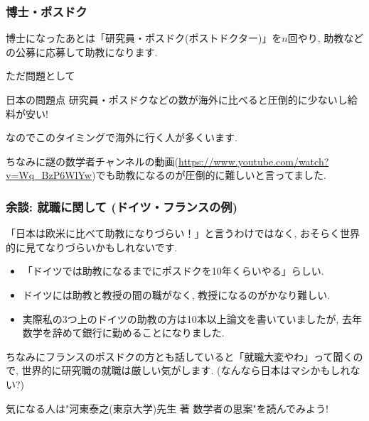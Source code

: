 \documentclass[11pt,dvipdfmx]{beamer}
\theoremstyle{definition}
\theoremstyle{remark}
\begin{document}
 
 \begin{frame} 
 \frametitle{博士・ポスドク}

博士になったあとは「研究員・ポスドク(ポストドクター)」を$n$回やり, 助教などの公募に応募して助教になります.

\vspace{11pt}
ただ問題として
\pause
\begin{block}{日本の問題点}
研究員・ポスドクなどの数が海外に比べると圧倒的に少ないし給料が安い!
\end{block}
なのでこのタイミングで海外に行く人が多くいます.

\vspace{11pt}
ちなみに謎の数学者チャンネルの動画(\url{https://www.youtube.com/watch?v=Wq_BzP6WlYw})でも助教になるのが圧倒的に難しいと言ってました. 

 \end{frame}
 
  \begin{frame} 
 \frametitle{余談: 就職に関して (ドイツ・フランスの例)}
「日本は欧米に比べて助教になりづらい！」と言うわけではなく, おそらく世界的に見てなりづらいかもしれないです.

\begin{itemize}
\item  「ドイツでは助教になるまでにポスドクを10年くらいやる」らしい. 
\item ドイツには助教と教授の間の職がなく, 教授になるのがかなり難しい. 
\item 実際私の3つ上のドイツの助教の方は10本以上論文を書いていましたが, 去年数学を辞めて銀行に勤めることになりました. 
\end{itemize}
ちなみにフランスのポスドクの方とも話していると「就職大変やわ」って聞くので, 世界的に研究職の就職は厳しい気がします. (なんなら日本はマシかもしれない?)

\vspace{11pt}
気になる人は"河東泰之(東京大学)先生 著 数学者の思案"を読んでみよう!
  \end{frame}
 
\end{document}
